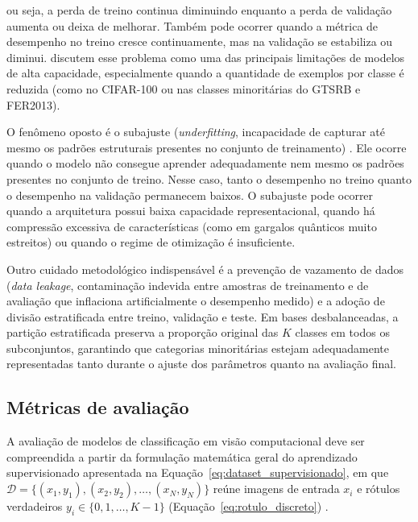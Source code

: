 \documentclass[
    12pt,
    openright,
    oneside,
    a4paper,
    english,
    brazil
]{abntex2}
\begin{document}
ou seja, a perda de treino continua diminuindo enquanto a perda de validação aumenta ou deixa de melhorar. Também pode ocorrer quando a métrica de desempenho no treino cresce continuamente, mas na validação se estabiliza ou diminui.  discutem esse problema como uma das principais limitações de modelos de alta capacidade, especialmente quando a quantidade de exemplos por classe é reduzida (como no CIFAR-100 ou nas classes minoritárias do GTSRB e FER2013).

O fenômeno oposto é o subajuste (\textit{underfitting}, incapacidade de capturar até mesmo os padrões estruturais presentes no conjunto de treinamento) \cite{goodfellow2016deep,deisenroth2020mathematics}. Ele ocorre quando o modelo não consegue aprender adequadamente nem mesmo os padrões presentes no conjunto de treino. Nesse caso, tanto o desempenho no treino quanto o desempenho na validação permanecem baixos. O subajuste pode ocorrer quando a arquitetura possui baixa capacidade representacional, quando há compressão excessiva de características (como em gargalos quânticos muito estreitos) ou quando o regime de otimização é insuficiente.

Outro cuidado metodológico indispensável é a prevenção de vazamento de dados (\textit{data leakage}, contaminação indevida entre amostras de treinamento e de avaliação que inflaciona artificialmente o desempenho medido) \cite{Wazlawick2020,goodfellow2016deep} e a adoção de divisão estratificada entre treino, validação e teste. Em bases desbalanceadas, a partição estratificada preserva a proporção original das \(K\) classes em todos os subconjuntos, garantindo que categorias minoritárias estejam adequadamente representadas tanto durante o ajuste dos parâmetros quanto na avaliação final.

\subsection{Métricas de avaliação}
\label{subsec:metricas_avaliacao}

A avaliação de modelos de classificação em visão computacional deve ser compreendida a partir da formulação matemática geral do aprendizado supervisionado apresentada na Equação~\eqref{eq:dataset_supervisionado}, em que \(\mathcal{D} = \{(x_1,y_1),(x_2,y_2),\ldots,(x_N,y_N)\}\) reúne imagens de entrada \(x_i\) e rótulos verdadeiros \(y_i \in \{0, 1, \dots, K-1\}\) (Equação~\eqref{eq:rotulo_discreto}) \cite{deisenroth2020mathematics}.
\end{document}
